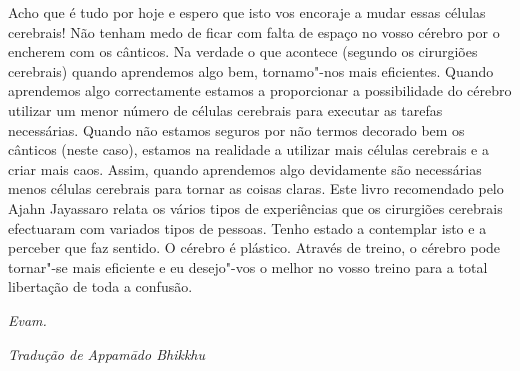 Acho que é tudo por hoje e espero que isto vos encoraje a mudar essas
células cerebrais! Não tenham medo de ficar com falta de espaço no vosso
cérebro por o encherem com os cânticos. Na verdade o que acontece
(segundo os cirurgiões cerebrais) quando aprendemos algo bem,
tornamo"-nos mais eficientes. Quando aprendemos algo correctamente
estamos a proporcionar a possibilidade do cérebro utilizar um menor
número de células cerebrais para executar as tarefas necessárias. Quando
não estamos seguros por não termos decorado bem os cânticos (neste
caso), estamos na realidade a utilizar mais células cerebrais e a criar
mais caos. Assim, quando aprendemos algo devidamente são necessárias
menos células cerebrais para tornar as coisas claras. Este livro
recomendado pelo Ajahn Jayassaro relata os vários tipos de experiências
que os cirurgiões cerebrais efectuaram com variados tipos de pessoas.
Tenho estado a contemplar isto e a perceber que faz sentido. O cérebro é
plástico. Através de treino, o cérebro pode tornar"-se mais eficiente e
eu desejo"-vos o melhor no vosso treino para a total libertação de toda a
confusão.

\emph{Evam.}

\bigskip

{\raggedleft\itshape
  Tradução de Appamādo Bhikkhu
\par}
